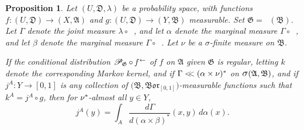 \documentclass[
twoside=true,
paper=letter,
fontsize=9pt,
pagesize=auto,
leqno,
openany,
headsepline,
overfullrule,
]{scrbook}
\theoremstyle{plain}
\theoremstyle{plain}
\newtheorem{prop}[thm]{Proposition}
\theoremstyle{definition}
\theoremstyle{bfnoteitalic}
\theoremstyle{bfnoteroman}
\newcommand{\sigalg}[1]{\mathfrak{#1}}
\newcommand{\cali}[1]{\mathscr{#1}}
\newcommand{\condprobop}[1]{\mathop{\cali{P}\hspace{-1pt}}\nolimits_{#1}}
\newcommand{\borel}{\mathfrak{Bor}}
\newcommand{\sagb}{\mathop{\hbox{\large{$\sigma$}}}\nolimits}
\newcommand{\textsigma}{\hbox{\large{$\sigma$}}\kern-1pt}
\newcommand{\preimage}[1]{\mathop{#1^{\leftarrow}}}
\newcommand{\sigmaalgebra}{\sigalg{A}}
\newcommand{\sigmaalgebraii}{\sigalg{B}}
\newcommand{\productsig}[2]{\sagb(#1,#2)}
\newcommand{\kernast}{\ast\kern-1pt}
\newcommand{\funcf}{f}
\newcommand{\funcg}{g}
\newcommand{\funcj}{j}
\newcommand{\funck}{k}
\newcommand{\measurespace}{X}
\newcommand{\measurespaceii}{Y}
\newcommand{\mspaceelt}{x}
\newcommand{\mspaceeltii}{y}
\newcommand{\abscont}{\mathrel{< \kern-3.5pt <}}
\newcommand{\measnu}{\nu}
\newcommand{\measlambda}{\lambda}
\newcommand{\seti}{A}
\newcommand{\projectionone}{\pi_1}
\newcommand{\projectiontwo}{\pi_2}
\newcommand{\uspace}{U}%
\newcommand{\uspacesig}{\sigalg{D}}
\newcommand{\measonprod}{\Gamma}%
\newcommand{\marginalone}{\alpha}%
\newcommand{\marginaltwo}{\beta}%
\begin{document}
\begin{prop}\label{bayes_mark_one}
Let
$(\uspace, \uspacesig, \measlambda)$
be a probability space, with functions
$\funcf:(\uspace,\uspacesig)\to (\measurespace,\sigmaalgebra)$
and
$\funcg:(\uspace,\uspacesig)\to (\measurespaceii,\sigmaalgebraii)$
measurable.
Set
$\sigalg{G} = \preimage{\funcg}(\sigmaalgebraii)$.
Let $\measonprod$ denote the joint measure
$\measlambda\circ\preimage{({\funcf,\funcg})}$,
and let $\marginalone$  denote the marginal measure $\measonprod\circ \preimage{\projectionone}$,
and let $\marginaltwo$ denote the marginal measure $\measonprod\circ \preimage{\projectiontwo}$.
Let $\measnu$ be a \textsigma\hyp{}finite measure on $\sigmaalgebraii$.

If the conditional distribution
$\condprobop{\sigalg{G}}\circ \preimage{\funcf}$ of $\funcf$ on
$\sigmaalgebra$ given $\sigalg{G}$ is regular, letting $\funck$ denote the corresponding Markov kernel,
and if
$\measonprod \abscont (\marginalone\times\measnu)^*$
on
$\productsig{\sigmaalgebra}{\sigmaalgebraii}$,
and if
$\funcj^\seti : \measurespaceii \to [0,1]$
is any collection of
$\bigl( \sigmaalgebraii,\borel_{[0,1]} \bigr)$\hyp{}measurable
functions such that
$\funck^\seti = \funcj^\seti \circ \funcg$,
then for $\measnu^\kernast$\hyp{}almost all $\mspaceeltii\in\measurespaceii$,
\[
\funcj^\seti(\mspaceeltii)
=
\int_\seti
\dfrac{d\measonprod}{d(\marginalone\times\marginaltwo)^*}
(\mspaceelt,\mspaceeltii)\, d\marginalone(\mspaceelt).
\]
\end{prop}
\end{document}

